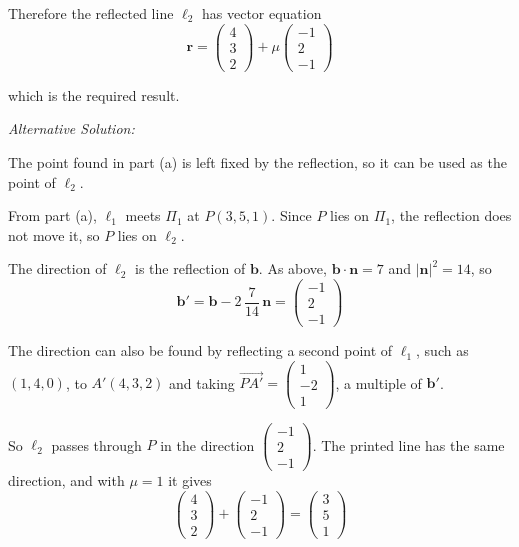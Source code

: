 \documentclass[leqno]{article}
\begin{document}
\begin{enumerate}[
  label=\textbf{\arabic*.},
  leftmargin=*,
  topsep=0pt,
  partopsep=0pt,
  parsep=0pt
]
\begin{djsSolution}
\begin{enumerate}[label=\textbf{(\alph*)}]
\vspace{8pt}
Therefore the reflected line $\ell_2$ has vector equation
\[
\mathbf r=
\begin{pmatrix}4\\3\\2\end{pmatrix}
+
\mu
\begin{pmatrix}-1\\2\\-1\end{pmatrix}
\]

which is the required result.

{\setlength{\parskip}{8pt}%
\textit{Alternative Solution:}

The point found in part (a) is left fixed by the reflection, so it can be used as the point of $\ell_2$.

From part (a), $\ell_1$ meets $\Pi_1$ at $P(3,5,1)$. Since $P$ lies on $\Pi_1$, the reflection does not move it, so $P$ lies on $\ell_2$.

The direction of $\ell_2$ is the reflection of $\mathbf b$. As above, $\mathbf b\cdot\mathbf n=7$ and $|\mathbf n|^2=14$, so
\[
\mathbf b'=\mathbf b-2\,\dfrac{7}{14}\,\mathbf n=\begin{pmatrix}-1\\2\\-1\end{pmatrix}
\]

The direction can also be found by reflecting a second point of $\ell_1$, such as $(1,4,0)$, to $A'(4,3,2)$ and taking $\overrightarrow{PA'}=\begin{pmatrix}1\\-2\\1\end{pmatrix}$, a multiple of $\mathbf b'$.

So $\ell_2$ passes through $P$ in the direction $\begin{pmatrix}-1\\2\\-1\end{pmatrix}$. The printed line has the same direction, and with $\mu=1$ it gives
\[
\begin{pmatrix}4\\3\\2\end{pmatrix}+\begin{pmatrix}-1\\2\\-1\end{pmatrix}=\begin{pmatrix}3\\5\\1\end{pmatrix}
\]

}
\end{enumerate}
\end{djsSolution}
\end{enumerate}
\end{document}
